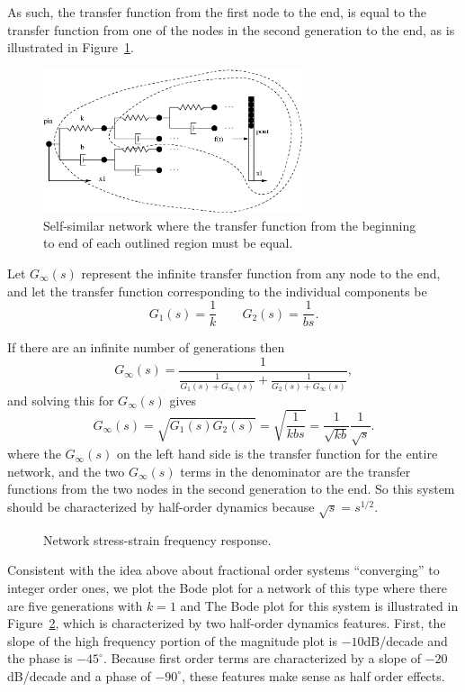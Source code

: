 As such, the transfer function from the first node to the end, is equal to the transfer function from one of the nodes in the second generation to the end, as is illustrated in Figure~\ref{fig:selfsimilar}.

\begin{figure}
  \centering
  \includegraphics[width=3in]{figs/structure3}
  \caption{Self-similar network where the transfer function from the beginning to end of each outlined region must be equal.}
  \label{fig:selfsimilar}
\end{figure}

Let $G_\infty(s)$ represent the infinite transfer function from any node to the end, and let the transfer function corresponding to the individual components be
\begin{equation}
  G_1(s) = \frac{1}{k} \qquad G_2(s) = \frac{1}{bs}.
  \label{eq:selfsimilarbuild}
\end{equation}

If there are an infinite number of generations then
\[
  G_\infty(s) = \frac{1}{\frac{1}{G_1(s) + G_\infty(s)} +
  \frac{1}{G_2(s) + G_\infty(s)}},
\]
and solving this for $G_\infty(s)$ gives
\[
  G_\infty(s) = \sqrt{G_1(s) G_2(s)} =\sqrt{\frac{1}{k b s }} = \frac{1}{\sqrt{kb}} \frac{1}{\sqrt{s}}.
\] 
where the $G_\infty(s)$ on the left hand side is the transfer function for the entire network, and the two $G_\infty(s)$ terms in the denominator are the transfer functions from the two nodes in the second generation to the end. So this system should be characterized by half-order dynamics because $\sqrt{s} = s^{1/2}$.

\begin{figure}
  \centering
  
  \caption{Network stress-strain frequency response.}
  \label{fig:bodeelement}
\end{figure}

Consistent with the idea above about fractional order systems ``converging'' to integer order ones, we plot the Bode plot for a network of this type where there are five generations with $k =1$ and The Bode plot for this system is illustrated in Figure~\ref{fig:bodeelement}, which is characterized by two half-order dynamics features. First, the slope of the high frequency portion of the magnitude plot is $-10$dB/decade and the phase is $-45^\circ$. Because first order terms are characterized by a slope of $-20$dB/decade and a phase of $-90^\circ$, these features make sense as half order effects.

